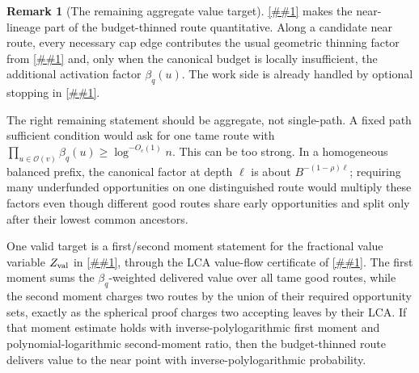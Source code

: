 \documentclass[10pt]{article}
\newcommand{\cref}[1]{\ref{##1}}
\newcommand{\Cref}[1]{\ref{##1}}
\theoremstyle{definition}
\newtheorem{remark}[theorem]{Remark}
\begin{document}
\begin{remark}[The remaining aggregate value target]\label{rem:value-delivery-target}
   \Cref{lem:canonical-budget-activation} makes the near-lineage part of the
   budget-thinned route quantitative. Along a candidate near route, every
   necessary cap edge contributes the usual geometric thinning factor from
   \cref{lem:thin-lineage} and, only when the canonical budget is locally
   insufficient, the additional activation factor $\beta_q(u)$. The work side
   is already handled by optional stopping in
   \cref{lem:budget-thinned-opportunities}.

   The right remaining statement should be aggregate, not single-path. A fixed
   path sufficient condition would ask for one tame route with
   $\prod_{u\in\mathcal O(v)}\beta_q(u)\ge\log^{-O_c(1)}n$. This can be too
   strong. In a homogeneous balanced prefix, the canonical factor at depth
   $\ell$ is about $B^{-(1-\rho)\ell}$; requiring many underfunded opportunities
   on one distinguished route would multiply these factors even though different
   good routes share early opportunities and split only after their lowest
   common ancestors.

   One valid target is a first/second moment statement for the fractional value
   variable $Z_{\rm val}$ in \cref{cor:fractional-value-delivery}, through the
   LCA value-flow certificate of \cref{lem:lca-value-flow}. The first moment
   sums the $\beta_q$-weighted delivered value over all tame good routes, while
   the second moment charges two routes by the union of their required
   opportunity sets, exactly as the spherical proof charges two accepting
   leaves by their LCA. If that moment estimate holds with
   inverse-polylogarithmic first moment and polynomial-logarithmic
   second-moment ratio, then the budget-thinned route delivers value to the
   near point with inverse-polylogarithmic probability.


\end{remark}
\end{document}
